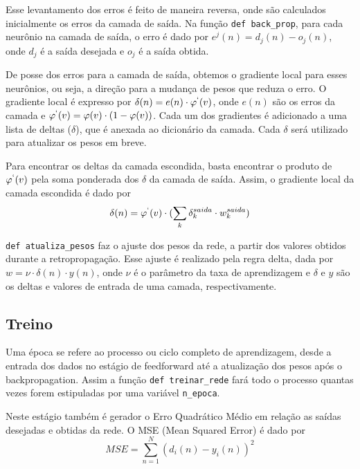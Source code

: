\documentclass[12pt,a4paper]{article}
\begin{document}
\qquad Esse levantamento dos erros é feito de maneira reversa, onde são calculados inicialmente os erros da camada de saída. Na função \verb|def back_prop|, para cada neurônio na camada de saída, o erro é dado por $e^j(n) = d_j(n)-o_j(n)$, onde $d_j$ é a saída desejada e $o_j$ é a saída obtida.

\qquad De posse dos erros para a camada de saída, obtemos o gradiente local para esses neurônios, ou seja, a direção para a mudança de pesos que reduza o erro. O gradiente local é expresso por $\delta(n) = e(n)\cdot  \varphi^{`}(v)$, onde $e(n)$ são os erros da camada e $\varphi^{`}(v) = \varphi(v)\cdot (1 - \varphi(v))$. Cada um dos gradientes é adicionado a uma lista de deltas ($\delta$), que é anexada ao dicionário da camada. Cada $\delta$ será utilizado para atualizar os pesos em breve.

\qquad Para encontrar os deltas da camada escondida, basta encontrar o produto de $\varphi^{`}(v)$ pela soma ponderada dos $\delta$ da camada de saída. Assim, o gradiente local da camada escondida é dado por
$$\delta(n) =\varphi^{`}(v) \cdot (\sum_k \delta_{k}^{saida}\cdot w_{k}^{saida})$$

\qquad \verb|def atualiza_pesos| faz o ajuste dos pesos da rede, a partir dos valores obtidos durante a retropropagação. Esse ajuste é realizado pela regra delta, dada por $w = \nu \cdot \delta (n) \cdot y(n)$, onde $\nu$ é o parâmetro da taxa de aprendizagem e $\delta$ e $y$ são os deltas e valores de entrada de uma camada, respectivamente.\\

\subsection{Treino}

\qquad Uma época se refere ao processo ou ciclo completo de aprendizagem, desde a entrada dos dados no estágio de feedforward até a atualização dos pesos após o backpropagation. Assim a função \verb|def treinar_rede| fará todo o processo quantas vezes forem estipuladas por uma variável \verb|n_epoca|.

\qquad Neste estágio também é gerador o Erro Quadrático Médio em relação as saídas desejadas e obtidas da rede. O MSE (Mean Squared Error) é dado por
$$MSE = \sum_{n=1}^{N}(d_i(n)-y_i(n))^2$$
\end{document}
